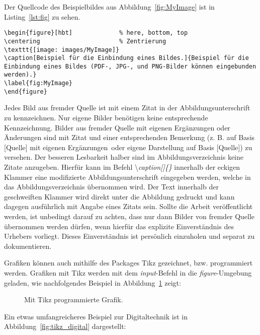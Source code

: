 Der Quellcode des Beispielbildes aus Abbildung~\ref{fig:MyImage} ist in Listing~\ref{lst:fig} zu sehen.

\clearpage

\begin{lstlisting}[caption=Quellcode der Abbildung~\ref{fig:MyImage}.,label=lst:fig]
\begin{figure}[hbt]				% here, bottom, top
\centering						% Zentrierung
\texttt{[image: images/MyImage]}		
\caption[Beispiel für die Einbindung eines Bildes.]{Beispiel für die Einbindung eines Bildes (PDF-, JPG-, und PNG-Bilder können eingebunden werden).}
\label{fig:MyImage}
\end{figure}
\end{lstlisting}

Jedes Bild aus fremder Quelle ist mit einem Zitat in der Abbildungsunterschrift zu kennzeichnen. Nur eigene Bilder benötigen keine entsprechende Kennzeichnung. Bilder aus fremder Quelle mit eigenen Ergänzungen oder Änderungen sind mit Zitat und einer entsprechenden Bemerkung (z. B. \glqq auf Basis [Quelle] mit eigenen Ergänzungen\grqq~oder \glqq eigene Darstellung auf Basis [Quelle]\grqq) zu versehen. Der besseren Lesbarkeit halber sind im Abbildungsverzeichnis keine Zitate anzugeben. Hierfür kann im Befehl \textbackslash \textit{caption[]\{\}} innerhalb der eckigen Klammer eine modifizierte Abbildungsunterschrift eingegeben werden, welche in das Abbildungsverzeichnis übernommen wird. Der Text innerhalb der geschweiften Klammer wird direkt unter die Abbildung gedruckt und kann dagegen ausführlich mit Angabe eines Zitats sein. Sollte die Arbeit veröffentlicht werden, ist unbedingt darauf zu achten, dass nur dann Bilder von fremder Quelle übernommen werden dürfen, wenn hierfür das explizite Einverständnis des Urhebers vorliegt. Dieses Einverständnis ist persönlich einzuholen und separat zu dokumentieren.

Grafiken können auch mithilfe des Packages Tikz gezeichnet, bzw. programmiert werden. Grafiken mit Tikz werden mit dem \textit{input}-Befehl in die \textit{figure}-Umgebung geladen, wie nachfolgendes Beispiel in Abbildung~\ref{fig:tikz_house} zeigt:

\begin{figure}[hbt]
	\centering
	
	\caption[Mit Tikz programmierte Grafik.]{Mit Tikz programmierte Grafik.}
	\label{fig:tikz_house}
\end{figure}

Ein etwas umfangreicheres Beispiel zur Digitaltechnik ist in Abbildung~\ref{fig:tikz_digital} dargestellt:

